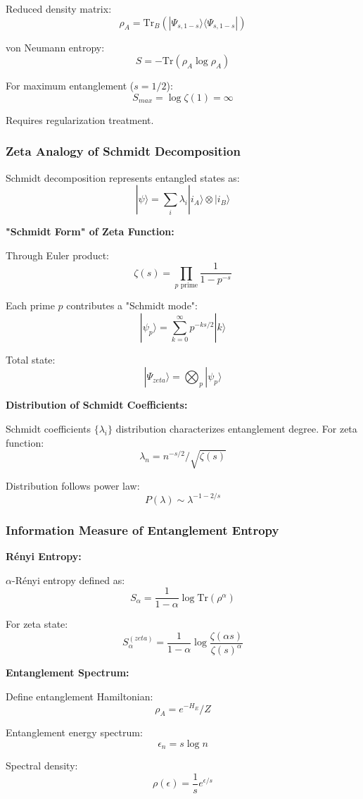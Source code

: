 \documentclass[11pt]{article}
\theoremstyle{plain}
\theoremstyle{definition}
\theoremstyle{remark}
\begin{document}
Reduced density matrix:
$$\rho_A = \text{Tr}_B(|\Psi_{s,1-s}\rangle\langle\Psi_{s,1-s}|)$$

von Neumann entropy:
$$S = -\text{Tr}(\rho_A \log \rho_A)$$

For maximum entanglement ($s = 1/2$):
$$S_{max} = \log \zeta(1) = \infty$$

Requires regularization treatment.

\subsubsection{Zeta Analogy of Schmidt Decomposition}

Schmidt decomposition represents entangled states as:
$$|\psi\rangle = \sum_i \lambda_i |i_A\rangle \otimes |i_B\rangle$$

\textbf{"Schmidt Form" of Zeta Function:}

Through Euler product:
$$\zeta(s) = \prod_{p \text{ prime}} \frac{1}{1-p^{-s}}$$

Each prime $p$ contributes a "Schmidt mode":
$$|\psi_p\rangle = \sum_{k=0}^{\infty} p^{-ks/2} |k\rangle$$

Total state:
$$|\Psi_{zeta}\rangle = \bigotimes_{p} |\psi_p\rangle$$

\textbf{Distribution of Schmidt Coefficients:}

Schmidt coefficients $\{\lambda_i\}$ distribution characterizes entanglement degree. For zeta function:
$$\lambda_n = n^{-s/2}/\sqrt{\zeta(s)}$$

Distribution follows power law:
$$P(\lambda) \sim \lambda^{-1-2/s}$$

\subsubsection{Information Measure of Entanglement Entropy}

\textbf{Rényi Entropy:}

$\alpha$-Rényi entropy defined as:
$$S_\alpha = \frac{1}{1-\alpha} \log \text{Tr}(\rho^\alpha)$$

For zeta state:
$$S_\alpha^{(zeta)} = \frac{1}{1-\alpha} \log \frac{\zeta(\alpha s)}{\zeta(s)^\alpha}$$

\textbf{Entanglement Spectrum:}

Define entanglement Hamiltonian:
$$\rho_A = e^{-H_E}/Z$$

Entanglement energy spectrum:
$$\epsilon_n = s \log n$$

Spectral density:
$$\rho(\epsilon) = \frac{1}{s} e^{\epsilon/s}$$
\end{document}
